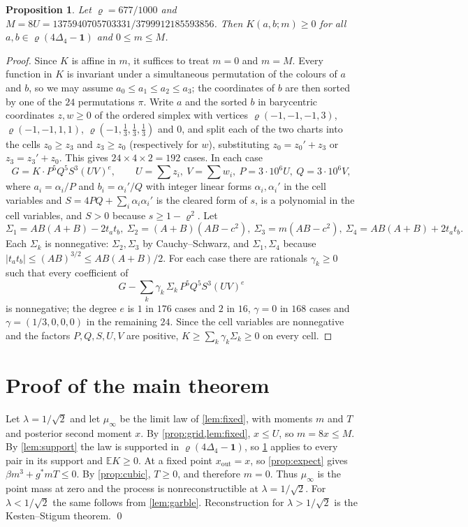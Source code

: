\documentclass[11pt]{amsart}
\newtheorem{proposition}[theorem]{Proposition}
\theoremstyle{definition}
\theoremstyle{remark}
\newcommand{\E}{\mathbb{E}}
\newcommand{\Simp}{\Delta_4}
\newcommand{\one}{\mathbf{1}}
\begin{document}
\begin{proposition}\label{prop:kernel}
Let $\varrho=677/1000$ and $M=8U=1375940705703331/3799912185593856$. Then $K(a,b;m)\ge0$ for all
$a,b\in\varrho(4\Simp-\one)$ and $0\le m\le M$.
\end{proposition}

\begin{proof}
Since $K$ is affine in $m$, it suffices to treat $m=0$ and $m=M$. Every function in $K$ is invariant
under a simultaneous permutation of the colours of $a$ and $b$, so we may assume
$a_0\le a_1\le a_2\le a_3$; the coordinates of $b$ are then sorted by one of the $24$ permutations
$\pi$. Write $a$ and the sorted $b$ in barycentric coordinates $z,w\ge0$ of the ordered simplex with
vertices $\varrho(-1,-1,-1,3)$, $\varrho(-1,-1,1,1)$, $\varrho(-1,\tfrac13,\tfrac13,\tfrac13)$ and $0$, and
split each of the two charts into the cells $z_0\ge z_3$ and $z_3\ge z_0$ (respectively for $w$),
substituting $z_0=z_0'+z_3$ or $z_3=z_3'+z_0$. This gives $24\times4\times2=192$ cases. In each case
\[
G=K\cdot P^5Q^5S^3(UV)^e,\qquad U=\textstyle\sum z_i,\ V=\sum w_i,\ P=3\cdot10^6U,\ Q=3\cdot10^6V,
\]
where $a_i=\alpha_i/P$ and $b_i=\alpha_i'/Q$ with integer linear forms $\alpha_i,\alpha_i'$ in the
cell variables and $S=4PQ+\sum_i\alpha_i\alpha_i'$ is the cleared form of $s$, is a polynomial in the cell variables, and
$S>0$ because $s\ge1-\varrho^2$. Let
\[
\Sigma_1=AB(A+B)-2t_at_b,\ \Sigma_2=(A+B)(AB-c^2),\ \Sigma_3=m(AB-c^2),\ \Sigma_4=AB(A+B)+2t_at_b .
\]
Each $\Sigma_k$ is nonnegative: $\Sigma_2,\Sigma_3$ by Cauchy--Schwarz, and $\Sigma_1,\Sigma_4$ because
$|t_at_b|\le(AB)^{3/2}\le AB(A+B)/2$. For each case there are rationals $\gamma_k\ge0$ such that every
coefficient of
\[
G-\sum_k\gamma_k\,\Sigma_k\,P^5Q^5S^3(UV)^e
\]
is nonnegative; the degree $e$ is $1$ in $176$ cases and $2$ in $16$, $\gamma=0$ in $168$ cases and
$\gamma=(1/3,0,0,0)$ in the remaining $24$. Since the cell variables are nonnegative and the factors
$P,Q,S,U,V$ are positive, $K\ge\sum_k\gamma_k\Sigma_k\ge0$ on every cell.
\end{proof}

\section{Proof of the main theorem}\label{sec:proof}

Let $\lambda=1/\sqrt2$ and let $\mu_\infty$ be the limit law of \cref{lem:fixed}, with moments $m$ and
$T$ and posterior second moment $x$. By \cref{prop:grid,lem:fixed}, $x\le U$, so $m=8x\le M$. By
\cref{lem:support} the law is supported in $\varrho(4\Simp-\one)$, so \cref{prop:kernel} applies to
every pair in its support and $\E K\ge0$. At a fixed point $x_{\mathrm{out}}=x$, so
\cref{prop:expect} gives $\beta m^3+g^*mT\le0$. By \cref{prop:cubic}, $T\ge0$, and therefore $m=0$.
Thus $\mu_\infty$ is the point mass at zero and the process is nonreconstructible at $\lambda=1/\sqrt2$.
For $\lambda<1/\sqrt2$ the same follows from \cref{lem:garble}. Reconstruction for $\lambda>1/\sqrt2$ is
the Kesten--Stigum theorem. \qed
\end{document}
